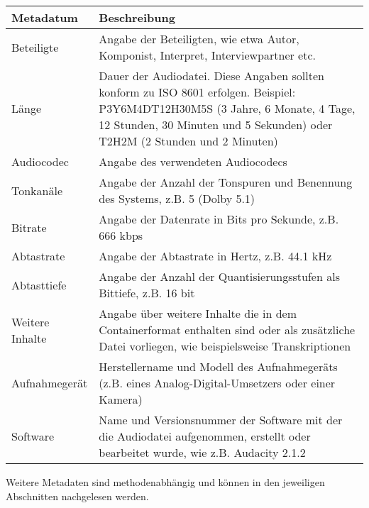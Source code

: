 \begin{center}
	\begin{tabular}{L{0.3\textwidth} p{0.6\textwidth}} 
		\toprule
		Metadatum & Beschreibung \\
		\midrule
		Beteiligte & Angabe der Beteiligten, wie etwa Autor, Komponist, Interpret, Interviewpartner etc.\\
		Länge & Dauer der Audiodatei. Diese Angaben sollten konform zu ISO 8601 erfolgen. Beispiel: P3Y6M4DT12H30M5S (3 Jahre, 6 Monate, 4 Tage, 12 Stunden, 30 Minuten und 5 Sekunden) oder T2H2M (2 Stunden und 2 Minuten)\\
		Audiocodec & Angabe des verwendeten Audiocodecs\\
		Tonkanäle & Angabe der Anzahl der Tonspuren und Benennung des Systems, z.B. 5 (Dolby 5.1)\\
		Bitrate & Angabe der Datenrate in Bits pro Sekunde, z.B. 666 kbps\\
		Abtastrate & Angabe der Abtastrate in Hertz, z.B. 44.1 kHz \\
		Abtasttiefe & Angabe der Anzahl der Quantisierungsstufen als Bittiefe, z.B. 16 bit\\
		Weitere Inhalte & Angabe über weitere Inhalte die in dem Containerformat enthalten sind oder als zusätzliche Datei vorliegen, wie beispielsweise Transkriptionen\\
		Aufnahmegerät & Herstellername und Modell des Aufnahmegeräts (z.B. eines Analog-Digital-Umsetzers oder einer Kamera)\\
		Software & Name und Versionsnummer der Software mit der die Audiodatei aufgenommen, erstellt oder bearbeitet wurde, wie z.B. Audacity 2.1.2\\
	  \bottomrule
		\bottomrule
	\end{tabular}
\end{center}

Weitere Metadaten sind methodenabhängig und können in den jeweiligen Abschnitten nachgelesen werden.